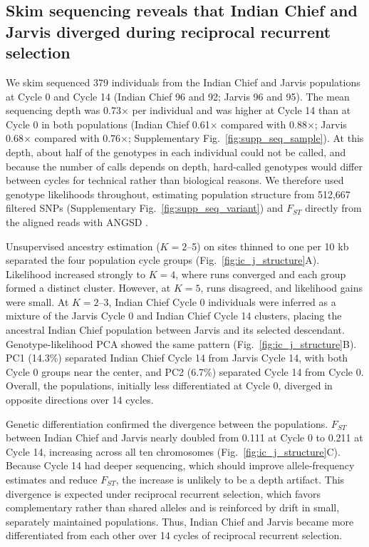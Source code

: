 \subsection{Skim sequencing reveals that Indian Chief and Jarvis diverged during reciprocal recurrent selection}

We skim sequenced 379 individuals from the Indian Chief and Jarvis populations at Cycle 0 and Cycle 14 (Indian Chief 96 and 92; Jarvis 96 and 95). The mean sequencing depth was 0.73$\times$ per individual and was higher at Cycle 14 than at Cycle 0 in both populations (Indian Chief 0.61$\times$ compared with 0.88$\times$; Jarvis 0.68$\times$ compared with 0.76$\times$; Supplementary Fig.~\ref{fig:supp_seq_sample}). At this depth, about half of the genotypes in each individual could not be called, and because the number of calls depends on depth, hard-called genotypes would differ between cycles for technical rather than biological reasons. We therefore used genotype likelihoods throughout, estimating population structure from 512,667 filtered SNPs (Supplementary Fig.~\ref{fig:supp_seq_variant}) and $F_{ST}$ directly from the aligned reads with ANGSD \citep{Korneliussen2014ANGSD}.

Unsupervised ancestry estimation ($K = 2$--5) on sites thinned to one per 10 kb separated the four population cycle groups (Fig.~\ref{fig:ic_j_structure}A). Likelihood increased strongly to $K = 4$, where runs converged and each group formed a distinct cluster. However, at $K = 5$, runs disagreed, and likelihood gains were small. At $K = 2$--3, Indian Chief Cycle 0 individuals were inferred as a mixture of the Jarvis Cycle 0 and Indian Chief Cycle 14 clusters, placing the ancestral Indian Chief population between Jarvis and its selected descendant. Genotype-likelihood PCA showed the same pattern (Fig.~\ref{fig:ic_j_structure}B). PC1 (14.3\%) separated Indian Chief Cycle 14 from Jarvis Cycle 14, with both Cycle 0 groups near the center, and PC2 (6.7\%) separated Cycle 14 from Cycle 0. Overall, the populations, initially less differentiated at Cycle 0, diverged in opposite directions over 14 cycles.

Genetic differentiation confirmed the divergence between the populations. $F_{ST}$ between Indian Chief and Jarvis nearly doubled from 0.111 at Cycle 0 to 0.211 at Cycle 14, increasing across all ten chromosomes (Fig.~\ref{fig:ic_j_structure}C). Because Cycle 14 had deeper sequencing, which should improve allele-frequency estimates and reduce $F_{ST}$, the increase is unlikely to be a depth artifact. This divergence is expected under reciprocal recurrent selection, which favors complementary rather than shared alleles \citep{Comstock1949RRS} and is reinforced by drift in small, separately maintained populations. Thus, Indian Chief and Jarvis became more differentiated from each other over 14 cycles of reciprocal recurrent selection.

